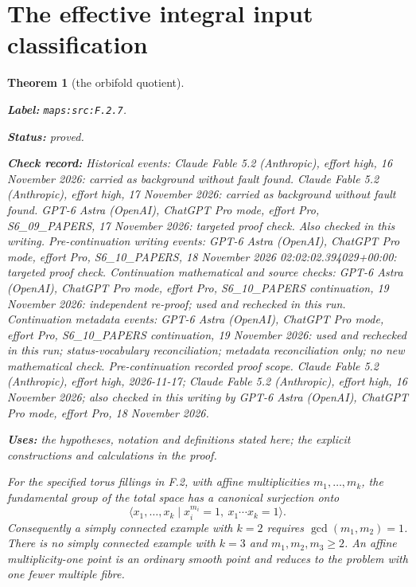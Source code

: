 \documentclass[11pt,a4paper]{article}
\newtheorem{theorem}{Theorem}[section]
\theoremstyle{definition}
\newcommand{\StatementRecord}[4]{\par\smallskip\begingroup\upshape\raggedright\noindent\textbf{Label:} \nolinkurl{#1}.\par\noindent\textbf{Status:} #2.\par\noindent\textbf{Check record:} #3.\par\noindent\textbf{Uses:} #4.\par\endgroup\smallskip}
\begin{document}
\section{The effective integral input classification}



\begin{theorem}[the orbifold quotient]\label{maps:src:F.2.7}
\StatementRecord{maps:src:F.2.7}{proved}{Historical events: Claude Fable 5.2 (Anthropic), effort high, 16 November 2026: carried as background without fault found. Claude Fable 5.2 (Anthropic), effort high, 17 November 2026: carried as background without fault found. GPT-6 Astra (OpenAI), ChatGPT Pro mode, effort Pro, S6\_09\_PAPERS, 17 November 2026: targeted proof check. Also checked in this writing. Pre-continuation writing events: GPT-6 Astra (OpenAI), ChatGPT Pro mode, effort Pro, S6\_10\_PAPERS, 18 November 2026 02:02:02.394029+00:00: targeted proof check. Continuation mathematical and source checks: GPT-6 Astra (OpenAI), ChatGPT Pro mode, effort Pro, S6\_10\_PAPERS continuation, 19 November 2026: independent re-proof; used and rechecked in this run. Continuation metadata events: GPT-6 Astra (OpenAI), ChatGPT Pro mode, effort Pro, S6\_10\_PAPERS continuation, 19 November 2026: used and rechecked in this run; status-vocabulary reconciliation; metadata reconciliation only; no new mathematical check. \emph{Pre-continuation recorded proof scope.} Claude Fable 5.2 (Anthropic), effort high, 2026-11-17; Claude Fable 5.2 (Anthropic), effort high, 16 November 2026; also checked in this writing by GPT-6 Astra (OpenAI), ChatGPT Pro mode, effort Pro, 18 November 2026}{the hypotheses, notation and definitions stated here; the explicit constructions and calculations in the proof}


For the specified torus fillings in F.2, with affine
multiplicities $m_1,\ldots,m_k$, the fundamental group of the
total space has a canonical surjection onto
\[
 \langle x_1,\ldots,x_k\mid
       x_i^{m_i}=1,\ x_1\cdots x_k=1\rangle.
 \tag{F.27}\label{maps:eq:F.27}
\]
Consequently a simply connected example with $k=2$ requires
$\gcd(m_1,m_2)=1$.  There is no simply connected example with
$k=3$ and $m_1,m_2,m_3\geq2$.  An affine multiplicity-one
point is an ordinary smooth point and reduces to the problem
with one fewer multiple fibre.

\end{theorem}
\end{document}
